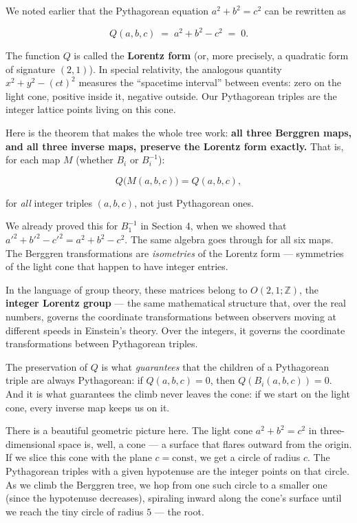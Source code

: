 We noted earlier that the Pythagorean equation \(a^2 + b^2 = c^2\) can be rewritten as

\[Q(a, b, c) \;=\; a^2 + b^2 - c^2 \;=\; 0.\]

The function \(Q\) is called the \textbf{Lorentz form} (or, more precisely, a quadratic form of signature \((2,1)\)). In special relativity, the analogous quantity \(x^2 + y^2 - (ct)^2\) measures the ``spacetime interval'' between events: zero on the light cone, positive inside it, negative outside. Our Pythagorean triples are the integer lattice points living on this cone.

Here is the theorem that makes the whole tree work: \textbf{all three Berggren maps, and all three inverse maps, preserve the Lorentz form exactly.} That is, for each map \(M\) (whether \(B_i\) or \(B_i^{-1}\)):

\[Q\bigl(M(a, b, c)\bigr) = Q(a, b, c),\]

for \emph{all} integer triples \((a, b, c)\), not just Pythagorean ones.

We already proved this for \(B_1^{-1}\) in Section 4, when we showed that \({a'}^2 + {b'}^2 - {c'}^2 = a^2 + b^2 - c^2\). The same algebra goes through for all six maps. The Berggren transformations are \emph{isometries} of the Lorentz form --- symmetries of the light cone that happen to have integer entries.

In the language of group theory, these matrices belong to \(O(2,1;\mathbb{Z})\), the \textbf{integer Lorentz group} --- the same mathematical structure that, over the real numbers, governs the coordinate transformations between observers moving at different speeds in Einstein's theory. Over the integers, it governs the coordinate transformations between Pythagorean triples.

The preservation of \(Q\) is what \emph{guarantees} that the children of a Pythagorean triple are always Pythagorean: if \(Q(a,b,c) = 0\), then \(Q(B_i(a,b,c)) = 0\). And it is what guarantees the climb never leaves the cone: if we start on the light cone, every inverse map keeps us on it.

There is a beautiful geometric picture here. The light cone \(a^2 + b^2 = c^2\) in three-dimensional space is, well, a cone --- a surface that flares outward from the origin. If we slice this cone with the plane \(c = \text{const}\), we get a circle of radius \(c\). The Pythagorean triples with a given hypotenuse are the integer points on that circle. As we climb the Berggren tree, we hop from one such circle to a smaller one (since the hypotenuse decreases), spiraling inward along the cone's surface until we reach the tiny circle of radius \(5\) --- the root.

